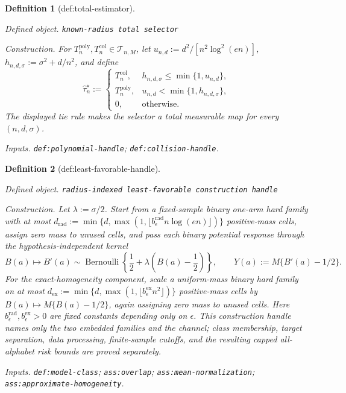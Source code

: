 \documentclass{article}
\newtheorem{definition}{Definition}
\begin{document}
\begin{definition}[def:total-estimator]\label{def:total-estimator}
\par\smallskip\noindent\emph{Defined object.} \texttt{known-\allowbreak{}radius total selector}
\par\smallskip\noindent\emph{Construction.} For \(T_n^{\mathrm{poly}},T_n^{\mathrm{col}}\in\mathcal T_{n,M}\), let \(u_{n,d}:=d^2/[n^2\log^2(en)]\), \(h_{n,d,\sigma}:=\sigma^2+d/n^2\), and define \[\widehat\tau_n^{\star}:=\begin{cases}T_n^{\mathrm{col}},&h_{n,d,\sigma}\le\min\{1,u_{n,d}\},\\T_n^{\mathrm{poly}},&u_{n,d}<\min\{1,h_{n,d,\sigma}\},\\0,&\text{otherwise}.\end{cases}\] The displayed tie rule makes the selector a total measurable map for every \((n,d,\sigma)\).
\par\smallskip\noindent\emph{Inputs.} \texttt{def:\allowbreak{}polynomial-\allowbreak{}handle}; \texttt{def:\allowbreak{}collision-\allowbreak{}handle}.
\end{definition}

\begin{definition}[def:least-favorable-handle]\label{def:least-favorable-handle}
\par\smallskip\noindent\emph{Defined object.} \texttt{radius-\allowbreak{}indexed least-\allowbreak{}favorable construction handle}
\par\smallskip\noindent\emph{Construction.} Let \(\lambda:=\sigma/2\).  Start from a fixed-sample binary one-arm hard family with at most \(d_{\mathrm{rad}}:=\min\{d,\max(1,\lfloor b_{\epsilon}^{\mathrm{rad}}n\log(en)\rfloor)\}\) positive-mass cells, assign zero mass to unused cells, and pass each binary potential response through the hypothesis-independent kernel
\[
 B(a)\longmapsto B'(a)\sim\operatorname{Bernoulli}\!\left\{\frac12+\lambda\left(B(a)-\frac12\right)\right\},
 \qquad Y(a):=M\{B'(a)-1/2\}.
\]
For the exact-homogeneity component, scale a uniform-mass binary hard family on at most \(d_{\mathrm{ex}}:=\min\{d,\max(1,\lfloor b_{\epsilon}^{\mathrm{ex}}n^2\rfloor)\}\) positive-mass cells by \(B(a)\mapsto M\{B(a)-1/2\}\), again assigning zero mass to unused cells.  Here \(b_{\epsilon}^{\mathrm{rad}},b_{\epsilon}^{\mathrm{ex}}>0\) are fixed constants depending only on \(\epsilon\).  This construction handle names only the two embedded families and the channel; class membership, target separation, data processing, finite-sample cutoffs, and the resulting capped all-alphabet risk bounds are proved separately.
\par\smallskip\noindent\emph{Inputs.} \texttt{def:\allowbreak{}model-\allowbreak{}class}; \texttt{ass:\allowbreak{}overlap}; \texttt{ass:\allowbreak{}mean-\allowbreak{}normalization}; \texttt{ass:\allowbreak{}approximate-\allowbreak{}homogeneity}.
\end{definition}
\end{document}
